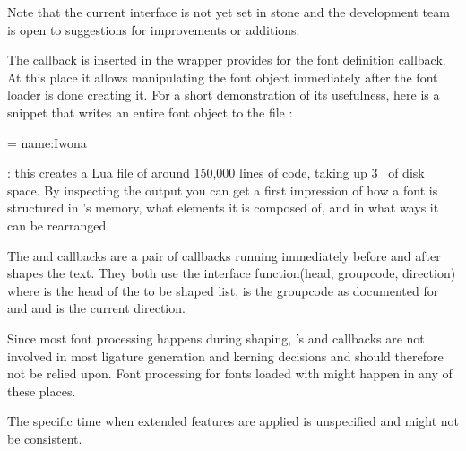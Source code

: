Note that the current interface is not yet set in stone and the
development team is open to suggestions for improvements or
additions.


The  callback is inserted in the wrapper
 provides for the font definition callback.
%
At this place it allows manipulating the font object immediately after
the font loader is done creating it.
%
For a short demonstration of its usefulness, here is a snippet that
writes an entire font object to the file :

\beginlisting
  
  \font \dumpme = name:Iwona
  \bye
\endlisting

: this creates a Lua file of around 150,000 lines of
code, taking up 3~ of disk space.
%
By inspecting the output you can get a first impression of how a font
is structured in \LuaTeX’s memory, what elements it is composed of,
and in what ways it can be rearranged.

The  and 
callbacks are a pair of  callbacks running
immediately before and after  shapes the text.
They both use the interface
\beginlisting
  function(head, groupcode, direction)
\endlisting
where  is the head of the to be shaped list,
 is the groupcode as documented for
 and  and
 is the current direction.

Since most font processing happens during shaping, \LuaTeX's
 and  callbacks are not involved
in most ligature generation and kerning decisions and should therefore not be
relied upon. Font processing for fonts loaded with  might
happen in any of these places.

The specific time when extended features are applied is unspecified and might
not be consistent.


